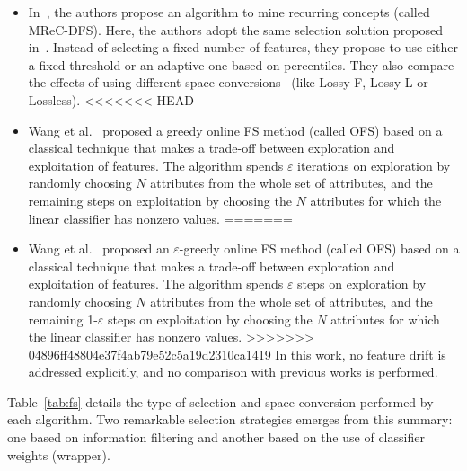 \documentclass[preprint,12pt]{elsarticle}
\begin{document}
\begin{itemize}
	\item In~\cite{gomes14}, the authors propose an algorithm to mine recurring concepts (called MReC-DFS). Here, the authors adopt the same selection solution proposed in~\cite{kata05}. Instead of selecting a fixed number of features, they propose to use either a fixed threshold or an adaptive one based on percentiles. They also compare the effects of using different space conversions~\cite{masud10} (like Lossy-F, Lossy-L or Lossless).
<<<<<<< HEAD
	\item Wang et al.~\cite{wang14} proposed a greedy online FS method (called OFS) based on a classical technique that makes a trade-off between exploration and exploitation of features. The algorithm spends $\varepsilon$ iterations on exploration by randomly choosing $N$ attributes from the whole set of attributes, and the remaining steps on exploitation by choosing the $N$ attributes for which the linear classifier has nonzero values. %
=======
	\item Wang et al.~\cite{wang14} proposed an $\varepsilon$-greedy online FS method (called OFS) based on a classical technique that makes a trade-off between exploration and exploitation of features. The algorithm spends $\varepsilon$ steps on exploration by randomly choosing $N$ attributes from the whole set of attributes, and the remaining 1-$\varepsilon$ steps on exploitation by choosing the $N$ attributes for which the linear classifier has nonzero values. %
>>>>>>> 04896ff48804e37f4ab79e52c5a19d2310ca1419
In this work, no feature drift is addressed explicitly, and no comparison with previous works is performed.
\end{itemize}

Table~\ref{tab:fs} details the type of selection and space conversion performed by each algorithm. Two remarkable selection strategies emerges from this summary: one based on information filtering and another based on the use of classifier weights (wrapper). 
\end{document}
